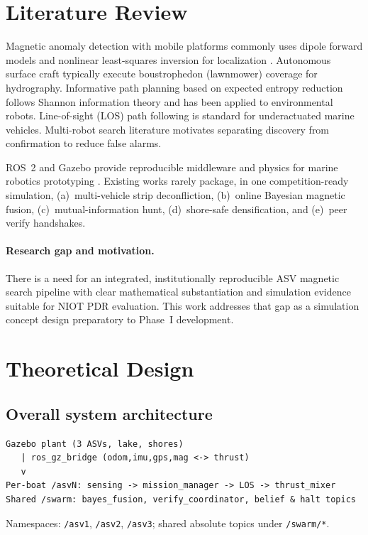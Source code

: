 \documentclass[11pt,a4paper]{article}
\begin{document}
\section{Literature Review}
Magnetic anomaly detection with mobile platforms commonly uses dipole forward
models and nonlinear least-squares inversion for localization
\cite{lm}. Autonomous surface craft typically execute boustrophedon (lawnmower)
coverage for hydrography. Informative path planning based on expected entropy
reduction follows Shannon information theory \cite{shannon} and has been applied
to environmental robots. Line-of-sight (LOS) path following is standard for
underactuated marine vehicles. Multi-robot search literature motivates separating
discovery from confirmation to reduce false alarms.

ROS~2 and Gazebo provide reproducible middleware and physics for marine
robotics prototyping \cite{ros2,gz}. Existing works rarely package, in one
competition-ready simulation, (a)~multi-vehicle strip deconfliction,
(b)~online Bayesian magnetic fusion, (c)~mutual-information hunt,
(d)~shore-safe densification, and (e)~peer verify handshakes.

\paragraph{Research gap and motivation.}
There is a need for an integrated, institutionally reproducible ASV magnetic
search pipeline with clear mathematical substantiation and simulation evidence
suitable for NIOT PDR evaluation. This work addresses that gap as a simulation
concept design preparatory to Phase~I development.

\section{Theoretical Design}
\subsection{Overall system architecture}
\begin{lstlisting}
Gazebo plant (3 ASVs, lake, shores)
   | ros_gz_bridge (odom,imu,gps,mag <-> thrust)
   v
Per-boat /asvN: sensing -> mission_manager -> LOS -> thrust_mixer
Shared /swarm: bayes_fusion, verify_coordinator, belief & halt topics
\end{lstlisting}
Namespaces: \texttt{/asv1}, \texttt{/asv2}, \texttt{/asv3}; shared absolute
topics under \texttt{/swarm/*}.
\end{document}

